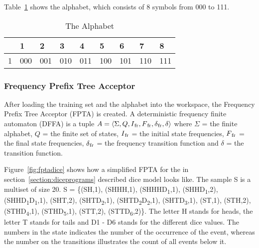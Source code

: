 \documentclass[
a4paper,
12pt
]{scrartcl}
\newcommand{\gray}{\cellcolor{grayself}}  %
\begin{document}
Table~\ref{table:alphabet} shows the alphabet, which consists of 8 symbols from 000 to 111.

\begin{table}[ht!]
\centering
\begin{tabular}{|l|l|l|l|l|l|l|l|l|}
\hline
\gray & \gray 1 & \gray 2 & \gray 3 & \gray 4 & \gray 5 & \gray 6 & \gray 7 & \gray 8 \\ \hline
\gray 1 & 000 & 001 & 010 & 011 & 100 & 101 & 110 & 111 \\ \hline
\end{tabular}
\caption{The Alphabet}
\label{table:alphabet}
\end{table}

\subsubsection{Frequency Prefix Tree Acceptor}
After loading the training set and the alphabet into the workspace, the Frequency Prefix Tree Acceptor (FPTA) is created. A deterministic frequency finite automaton (DFFA) is a tuple $A = \langle \Sigma, Q, I\textsubscript{fr}, F\textsubscript{fr}, \delta\textsubscript{fr}, \delta \rangle$ where $ \Sigma $ = the finite alphabet, $Q$ = the finite set of states, $I\textsubscript{fr}$ = the initial state frequencies, $F\textsubscript{fr}$ = the final state frequencies, $\delta\textsubscript{fr}$ = the frequency transition function and $ \delta$ = the transition function.

Figure~\ref{fig:fptadice} shows how a simplified FPTA for the in section~\ref{section:diceprograms} described dice model looks like. The sample S is a multiset of size 20. S = \{(SH,1), (SHHH,1), (SHHHD\textsubscript{1},1), (SHHD\textsubscript{1},2), (SHHD\textsubscript{1}D\textsubscript{1},1), (SHT,2), (SHTD\textsubscript{2},1), (SHTD\textsubscript{2}D\textsubscript{2},1), (SHTD\textsubscript{3},1), (ST,1), (STH,2), (STHD\textsubscript{4},1), (STHD\textsubscript{5},1), (STT,2), (STTD\textsubscript{6},2)\}. The letter H stands for heads, the letter T stands for tails and D1 - D6 stands for the different dice values. The numbers in the state indicates the number of the occurrence of the event, whereas the number on the transitions illustrates the count of all events below it.
\end{document}
